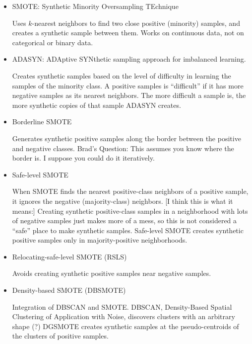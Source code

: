  		\begin{itemize}
			\item SMOTE:  Synthetic Minority Oversampling TEchnique 
			\cite{CHAWLA_2002}
			
			Uses $k$-nearest neighbors to find two close positive (minority) samples, and creates a synthetic sample between them.  Works on continuous data, not on categorical or binary data.  
			
			\item ADASYN:  ADAptive SYNthetic sampling approach for imbalanced learning.  
			\cite{MAHMUDAH_2021}
			
			Creates synthetic samples based on the level of difficulty in learning the samples of the minority class.  A positive samples is ``difficult'' if it has more negative samples as its nearest neighbors.  The more difficult a sample is, the more synthetic copies of that sample ADASYN creates.  
			
			\item Borderline SMOTE
			\cite{MAHMUDAH_2021}
			
			Generates synthetic positive samples along the border between the positive and negative classes.  Brad's Question:  This assumes you know where the border is.  I suppose you could do it iteratively.  
			
			\item Safe-level SMOTE
			\cite{MAHMUDAH_2021}

			When SMOTE finds the nearest positive-class neighbors of a positive sample, it ignores the negative (majority-class) neighbors.  [I think this is what it means:]  Creating synthetic positive-class samples in a neighborhood with lots of negative samples just makes more of a mess, so this is not considered a ``safe'' place to make synthetic samples.  Safe-level SMOTE creates synthetic positive samples only in majority-positive neighborhoods.  
			
			\item Relocating-safe-level SMOTE (RSLS)
			\cite{MAHMUDAH_2021}
			
			Avoids creating synthetic positive samples near negative samples.  
			
			\item Density-based SMOTE (DBSMOTE)
			\cite{MAHMUDAH_2021}

			Integration of DBSCAN and SMOTE.   DBSCAN, Density-Based Spatial Clustering of Application with Noise, discovers clusters with an arbitrary shape (?)  DGSMOTE creates synthetic samples at the pseudo-centroids of the clusters of positive samples.  
			

\end{itemize}
